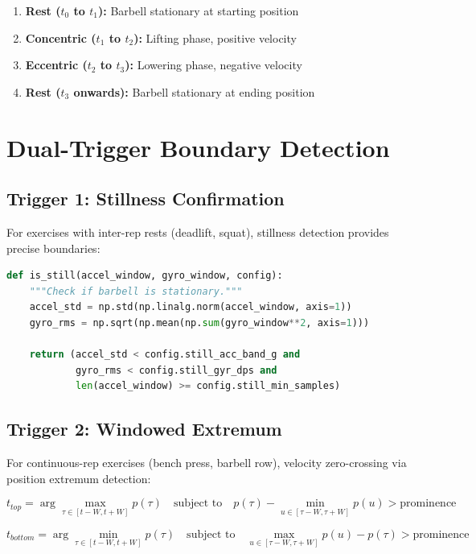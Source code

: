 \begin{enumerate}
    \item \textbf{Rest ($t_0$ to $t_1$):} Barbell stationary at starting position
    \item \textbf{Concentric ($t_1$ to $t_2$):} Lifting phase, positive velocity
    \item \textbf{Eccentric ($t_2$ to $t_3$):} Lowering phase, negative velocity
    \item \textbf{Rest ($t_3$ onwards):} Barbell stationary at ending position
\end{enumerate}

\section{Dual-Trigger Boundary Detection}

\subsection{Trigger 1: Stillness Confirmation}

For exercises with inter-rep rests (deadlift, squat), stillness detection provides precise boundaries:

\begin{lstlisting}[language=python]
def is_still(accel_window, gyro_window, config):
    """Check if barbell is stationary."""
    accel_std = np.std(np.linalg.norm(accel_window, axis=1))
    gyro_rms = np.sqrt(np.mean(np.sum(gyro_window**2, axis=1)))

    return (accel_std < config.still_acc_band_g and
            gyro_rms < config.still_gyr_dps and
            len(accel_window) >= config.still_min_samples)
\end{lstlisting}

\subsection{Trigger 2: Windowed Extremum}

For continuous-rep exercises (bench press, barbell row), velocity zero-crossing via position extremum detection:

\begin{equation}
    t_{top} = \arg\max_{\tau \in [t-W, t+W]} p(\tau) \quad \text{subject to} \quad
    p(\tau) - \min_{u \in [\tau-W, \tau+W]} p(u) > \text{prominence}
\end{equation}

\begin{equation}
    t_{bottom} = \arg\min_{\tau \in [t-W, t+W]} p(\tau) \quad \text{subject to} \quad
    \max_{u \in [\tau-W, \tau+W]} p(u) - p(\tau) > \text{prominence}
\end{equation}

